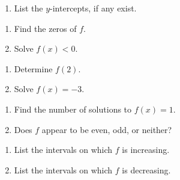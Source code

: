 \begin{ex}
\begin{multicols}{2}
\begin{enumerate}
\item  List the $y$-intercepts, if any exist.

\setcounter{HW}{\value{enumi}}
\end{enumerate}
\end{multicols}

\begin{multicols}{2}
\begin{enumerate}
\setcounter{enumi}{\value{HW}}

\item  Find the zeros of $f$.

\item  Solve $f(x) < 0$.

\setcounter{HW}{\value{enumi}}
\end{enumerate}
\end{multicols}

\begin{multicols}{2}
\begin{enumerate}
\setcounter{enumi}{\value{HW}}

\item  Determine $f(2)$.

\item  Solve $f(x) = -3$.  

\setcounter{HW}{\value{enumi}}
\end{enumerate}
\end{multicols}


\begin{multicols}{2}
\begin{enumerate}
\setcounter{enumi}{\value{HW}}

\item  Find the number of solutions to $f(x) = 1$.

\item  Does $f$ appear to be even, odd, or neither?

\setcounter{HW}{\value{enumi}}
\end{enumerate}
\end{multicols}


\begin{multicols}{2}
\begin{enumerate}
\setcounter{enumi}{\value{HW}}

\item  List the intervals on which $f$ is increasing.

\item  List the intervals on which $f$ is decreasing.

\setcounter{HW}{\value{enumi}}
\end{enumerate}
\end{multicols}


\end{ex}
